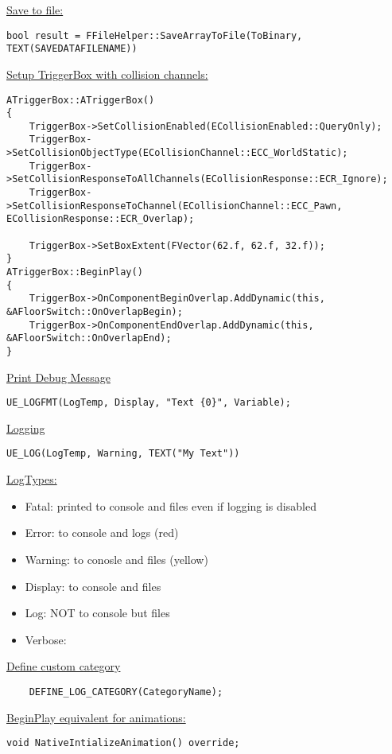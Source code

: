         \uline{Save to file:}
\begin{lstlisting}
bool result = FFileHelper::SaveArrayToFile(ToBinary, TEXT(SAVEDATAFILENAME))
\end{lstlisting}
        \uline{Setup TriggerBox with collision channels:}
\begin{lstlisting}
ATriggerBox::ATriggerBox()
{
    TriggerBox->SetCollisionEnabled(ECollisionEnabled::QueryOnly);
    TriggerBox->SetCollisionObjectType(ECollisionChannel::ECC_WorldStatic);
    TriggerBox->SetCollisionResponseToAllChannels(ECollisionResponse::ECR_Ignore);
    TriggerBox->SetCollisionResponseToChannel(ECollisionChannel::ECC_Pawn, ECollisionResponse::ECR_Overlap);

    TriggerBox->SetBoxExtent(FVector(62.f, 62.f, 32.f));
}
ATriggerBox::BeginPlay()
{
    TriggerBox->OnComponentBeginOverlap.AddDynamic(this, &AFloorSwitch::OnOverlapBegin);
    TriggerBox->OnComponentEndOverlap.AddDynamic(this, &AFloorSwitch::OnOverlapEnd);
}
\end{lstlisting}

    \uline{Print Debug Message}
\begin{lstlisting}
UE_LOGFMT(LogTemp, Display, "Text {0}", Variable);
\end{lstlisting}

    \uline{Logging}
    \begin{lstlisting}
UE_LOG(LogTemp, Warning, TEXT("My Text"))
    \end{lstlisting}
    \uline{LogTypes:}
    \begin{itemize}
        \item Fatal: printed to console and files even if logging is disabled
        \item Error: to console and logs (red)
        \item Warning: to conosle and files (yellow)
        \item Display: to console and files
        \item Log: NOT to console but files
        \item Verbose:
    \end{itemize}
    \uline{Define custom category}
    \begin{lstlisting}
    DEFINE_LOG_CATEGORY(CategoryName);
    \end{lstlisting}
    
\uline{BeginPlay equivalent for animations:}
\begin{lstlisting}
void NativeIntializeAnimation() override;
\end{lstlisting}

